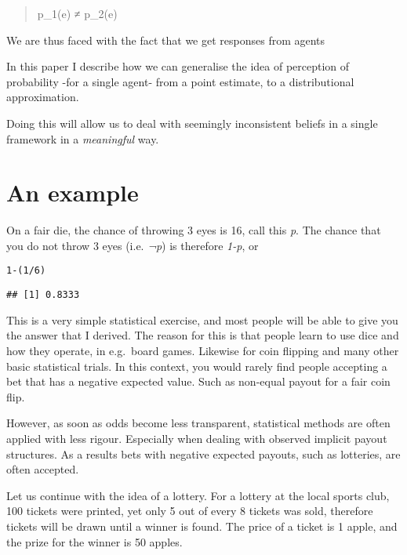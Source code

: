\documentclass[a4paper]{book}\usepackage{graphicx, color}
\makeatletter
\newenvironment{kframe}{%
 \def\at@end@of@kframe{}%
 \ifinner\ifhmode%
  \def\at@end@of@kframe{\end{minipage}}%
  \begin{minipage}{\columnwidth}%
 \fi\fi%
 \def\FrameCommand##1{\hskip\@totalleftmargin \hskip-\fboxsep
 \colorbox{shadecolor}{##1}\hskip-\fboxsep
     \hskip-\linewidth \hskip-\@totalleftmargin \hskip\columnwidth}%
 \MakeFramed {\advance\hsize-\width
   \@totalleftmargin\z@ \linewidth\hsize
   \@setminipage}}%
 {\par\unskip\endMakeFramed%
 \at@end@of@kframe}
\newenvironment{knitrout}{}{} %
\makeatother
\begin{document}
\begin{quote}
p\_1(e) ≠ p\_2(e)
\end{quote}

We are thus faced with the fact that we get responses from agents

In this paper I describe how we can generalise the idea of perception of
probability -for a single agent- from a point estimate, to a
distributional approximation.

Doing this will allow us to deal with seemingly inconsistent beliefs in
a single framework in a \emph{meaningful} way.

\section{An example}

On a fair die, the chance of throwing 3 eyes is 16, call this \emph{p}.
The chance that you do not throw 3 eyes (i.e. \emph{¬p}) is therefore
\emph{1-p}, or

\begin{knitrout}
\color{fgcolor}\begin{kframe}
\begin{alltt}
1 - (1/6)
\end{alltt}
\begin{verbatim}
## [1] 0.8333
\end{verbatim}
\end{kframe}
\end{knitrout}


This is a very simple statistical exercise, and most people will be able
to give you the answer that I derived. The reason for this is that
people learn to use dice and how they operate, in e.g.~board games.
Likewise for coin flipping and many other basic statistical trials. In
this context, you would rarely find people accepting a bet that has a
negative expected value. Such as non-equal payout for a fair coin flip.

However, as soon as odds become less transparent, statistical methods
are often applied with less rigour. Especially when dealing with
observed implicit payout structures. As a results bets with negative
expected payouts, such as lotteries, are often accepted.

Let us continue with the idea of a lottery. For a lottery at the local
sports club, 100 tickets were printed, yet only 5 out of every 8 tickets
was sold, therefore tickets will be drawn until a winner is found. The
price of a ticket is 1 apple, and the prize for the winner is 50 apples.
\end{document}
